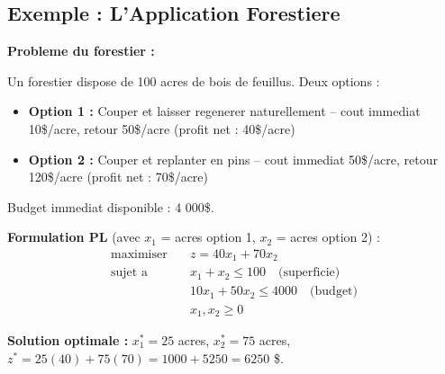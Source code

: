 \documentclass[12pt,a4paper]{article}
\begin{document}
\subsection{Exemple : L'Application Forestiere}

\begin{exemple}
\textbf{Probleme du forestier :}

Un forestier dispose de 100 acres de bois de feuillus. Deux options :
\begin{itemize}
    \item \textbf{Option 1 :} Couper et laisser regenerer naturellement -- cout immediat 10\$/acre, retour 50\$/acre (profit net : 40\$/acre)
    \item \textbf{Option 2 :} Couper et replanter en pins -- cout immediat 50\$/acre, retour 120\$/acre (profit net : 70\$/acre)
\end{itemize}

Budget immediat disponible : 4 000\$.

\textbf{Formulation PL} (avec $x_1$ = acres option 1, $x_2$ = acres option 2) :
\begin{align*}
\text{maximiser} \quad & z = 40x_1 + 70x_2\\
\text{sujet a} \quad & x_1 + x_2 \leq 100 \quad \text{(superficie)}\\
& 10x_1 + 50x_2 \leq 4000 \quad \text{(budget)}\\
& x_1, x_2 \geq 0
\end{align*}

\textbf{Solution optimale :} $x_1^* = 25$ acres, $x_2^* = 75$ acres, $z^* = 25(40) + 75(70) = 1000 + 5250 = 6250$ \$.
\end{exemple}
\end{document}

